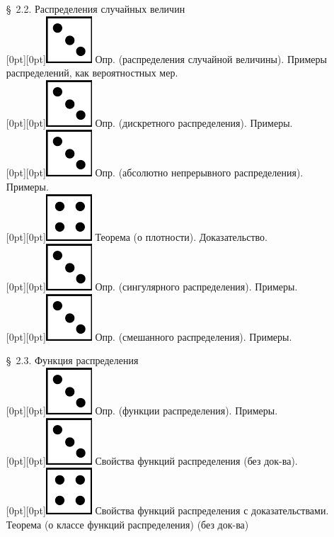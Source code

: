 \documentclass[10pt]{amsart}
\begin{document}
\begin{enumerate}
\begin{enumerate}
    
\item[\S\, 2.2.] Распределения случайных величин \\
 \raisebox{-1pt}[0pt][0pt]{\includegraphics[width=0.02\linewidth]{3.png}} Опр. (распределения случайной величины). Примеры распределений, как вероятностных мер. \\
 \raisebox{-1pt}[0pt][0pt]{\includegraphics[width=0.02\linewidth]{3.png}} Опр. (дискретного распределения). Примеры. \\
 \raisebox{-1pt}[0pt][0pt]{\includegraphics[width=0.02\linewidth]{3.png}} Опр. (абсолютно непрерывного распределения). Примеры. \\
 \raisebox{-1pt}[0pt][0pt]{\includegraphics[width=0.02\linewidth]{4.png}} Теорема (о плотности). Доказательство. \\
 \raisebox{-1pt}[0pt][0pt]{\includegraphics[width=0.02\linewidth]{3.png}} Опр. (сингулярного распределения). Примеры. \\
 \raisebox{-1pt}[0pt][0pt]{\includegraphics[width=0.02\linewidth]{3.png}} Опр. (смешанного распределения). Примеры. \\


\item[\S\, 2.3.] Функция распределения \\
    
 \raisebox{-1pt}[0pt][0pt]{\includegraphics[width=0.02\linewidth]{3.png}} Опр. (функции распределения). Примеры. \\
 \raisebox{-1pt}[0pt][0pt]{\includegraphics[width=0.02\linewidth]{3.png}} Свойства функций распределения (без док-ва). \\
 \raisebox{-1pt}[0pt][0pt]{\includegraphics[width=0.02\linewidth]{4.png}} Свойства функций распределения с доказательствами. \\
Теорема (о классе функций распределения) (без док-ва)\\



\end{enumerate}
\end{enumerate}
\end{document}
